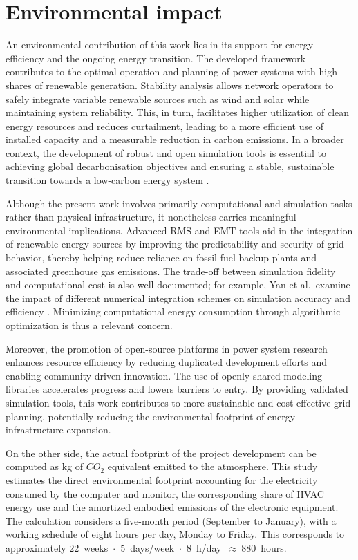 
\section{Environmental impact}

An environmental contribution of this work lies in its support for energy efficiency and the 
ongoing energy transition. The developed framework contributes to the optimal operation and planning
of power systems with high shares of renewable generation. Stability analysis allows network operators to 
safely integrate variable renewable sources such as wind and solar while maintaining system reliability. 
This, in turn, facilitates higher utilization of clean energy resources and reduces curtailment, 
leading to a more efficient use of installed capacity and a measurable reduction in carbon emissions. 
In a broader context, the development of robust and open simulation tools is essential to achieving global 
decarbonisation objectives and ensuring a stable, sustainable transition towards a low-carbon energy system \cite{IEA2024Transition}.

Although the present work involves primarily computational and simulation tasks rather than physical infrastructure,
it nonetheless carries meaningful environmental implications. Advanced RMS and EMT tools aid in the integration of 
renewable energy sources by improving the predictability and security of grid behavior, thereby helping reduce
reliance on fossil fuel backup plants and associated greenhouse gas emissions\cite{XiongParaEMT2024}. 
The trade-off between simulation fidelity and computational cost is also well documented; for example, Yan et al.\ examine
the impact of different numerical integration schemes on simulation accuracy and efficiency \cite{YanCompEff2025}. 
Minimizing computational energy consumption through algorithmic optimization is thus a relevant concern.

Moreover, the promotion of open-source platforms in power system research enhances resource efficiency by reducing 
duplicated development efforts and enabling community-driven innovation. The use of openly shared modeling libraries 
accelerates progress and lowers barriers to entry\cite{TesfatsionOpenSource}. By providing validated simulation tools, 
this work contributes to more sustainable and cost-effective grid planning, potentially reducing the environmental 
footprint of energy infrastructure expansion.

On the other side, the actual footprint of the project development can be computed as kg of $CO_2$ equivalent emitted
to the atmosphere. This study estimates the direct environmental footprint accounting for the
electricity consumed by the computer and monitor, the corresponding share of HVAC energy use and the amortized embodied 
emissions of the electronic equipment. 
The calculation considers a five-month period (September to January), with a working schedule of eight hours per day, Monday to Friday. 
This corresponds to approximately $22$~weeks~$ \cdot $~5~days/week~$ \cdot $~8~h/day~$\approx~880$~hours.

